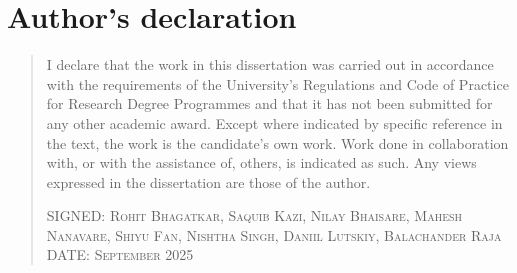 \chapter*{Author's declaration}

\begin{quote}
I declare that the work in this dissertation was carried out in accordance with the requirements of  the University's Regulations and Code of Practice for Research Degree Programmes and that it  has not been submitted for any other academic award. Except where indicated by specific  reference in the text, the work is the candidate's own work. Work done in collaboration with, or with the assistance of, others, is indicated as such. Any views expressed in the dissertation are those of the author.

\vspace{1.5cm}
\noindent\textsc{SIGNED: Rohit Bhagatkar, Saquib Kazi, Nilay Bhaisare, Mahesh Nanavare, 
Shiyu Fan, Nishtha Singh, Daniil Lutskiy, Balachander Raja} \\[0.5cm]
\noindent\textsc{DATE: September 2025}

\end{quote}